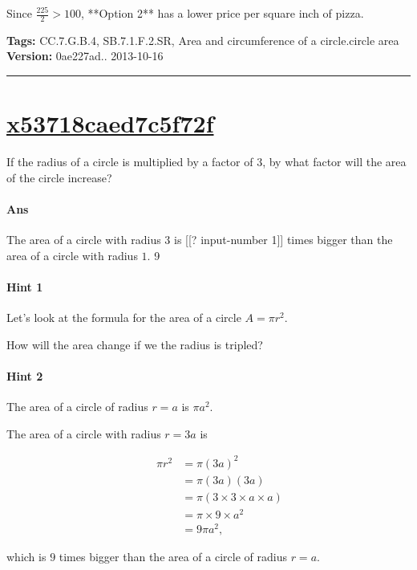 \documentclass[twocolumn,10pt]{article}
\begin{document}
Since $\frac{225}{2} > 100$, **Option 2** has a lower price per square inch of pizza.



\medskip
\noindent
\textbf{Tags:} {\footnotesize CC.7.G.B.4, SB.7.1.F.2.SR, Area and circumference of a circle.circle area}\\
\textbf{Version:} 0ae227ad.. 2013-10-16
\smallskip\hrule





\section{\href{https://www.khanacademy.org/devadmin/content/items/x53718caed7c5f72f}{x53718caed7c5f72f}}

\noindent
If the radius of a circle is multiplied by a factor of $3$, by what factor will the area of the circle increase?

\paragraph{Ans} The area of a circle with radius $3$ is [[? input-number 1]] times bigger than the area of a circle with radius $1$.  9

\paragraph{Hint 1}Let's look at the formula for the area of a circle $A=\pi r^2$.  

How will the area change if we the radius is tripled?

\paragraph{Hint 2}The area of a circle of radius $r=a$ is $\pi a^2$.

The area of a circle with radius $r=3a$ is 

\begin{align*}
\qquad 
 \pi r^2 & =\pi (3a)^2  \\
  & =\pi(3a)(3a) \\
  &=\pi(3 \times 3 \times a \times a)  \\
   &= \pi \times 9 \times a^2 \\
   &= 9\pi a^2,
\end{align*} 

which is $9$ times bigger than the area of a circle of radius $r=a$. 
\end{document}
